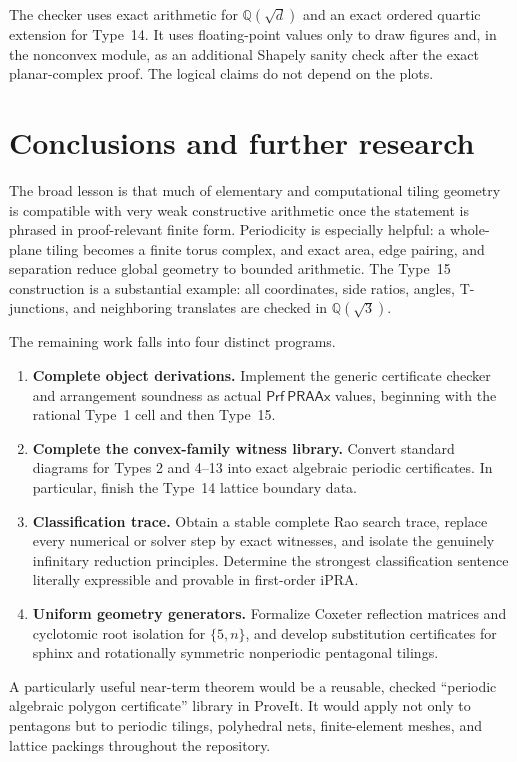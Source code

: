 \documentclass[11pt]{article}
\theoremstyle{remark}
\newcommand{\Q}{\mathbb Q}
\newcommand{\ipra}{\mathrm{iPRA}}
\newcommand{\code}[1]{\texttt{\detokenize{#1}}}
\newcommand{\Qsqrt}[1]{\Q(\sqrt{#1})}
\newcommand{\Prf}{\mathsf{Prf}}
\newcommand{\PRAAx}{\mathsf{PRAAx}}
\begin{document}
The checker uses exact \code{Fraction} arithmetic for \(\Qsqrt d\) and an
exact ordered quartic extension for Type~14.  It uses floating-point values
only to draw figures and, in the nonconvex module, as an additional Shapely
sanity check after the exact planar-complex proof.  The logical
claims do not depend on the plots.

\section{Conclusions and further research}

The broad lesson is that much of elementary and computational tiling geometry
is compatible with very weak constructive arithmetic once the statement is
phrased in proof-relevant finite form.  Periodicity is especially helpful: a
whole-plane tiling becomes a finite torus complex, and exact area, edge
pairing, and separation reduce global geometry to bounded arithmetic.  The
Type~15 construction is a substantial example: all coordinates, side ratios,
angles, T-junctions, and neighboring translates are checked in
\(\Qsqrt3\).

The remaining work falls into four distinct programs.

\begin{enumerate}
\item \textbf{Complete object derivations.}  Implement the generic certificate
checker and arrangement soundness as actual \(\Prf\ \PRAAx\) values, beginning
with the rational Type~1 cell and then Type~15.
\item \textbf{Complete the convex-family witness library.}  Convert standard
diagrams for Types 2 and 4--13 into exact algebraic periodic certificates.  In
particular, finish the Type~14 lattice boundary data.
\item \textbf{Classification trace.}  Obtain a stable complete Rao search
trace, replace every numerical or solver step by exact witnesses, and isolate
the genuinely infinitary reduction principles.  Determine the strongest
classification sentence literally expressible and provable in first-order
\(\ipra\).
\item \textbf{Uniform geometry generators.}  Formalize Coxeter reflection
matrices and cyclotomic root isolation for \(\{5,n\}\), and develop
substitution certificates for sphinx and rotationally symmetric nonperiodic
pentagonal tilings.
\end{enumerate}

A particularly useful near-term theorem would be a reusable, checked
``periodic algebraic polygon certificate'' library in ProveIt.  It would apply
not only to pentagons but to periodic tilings, polyhedral nets, finite-element
meshes, and lattice packings throughout the repository.
\end{document}
